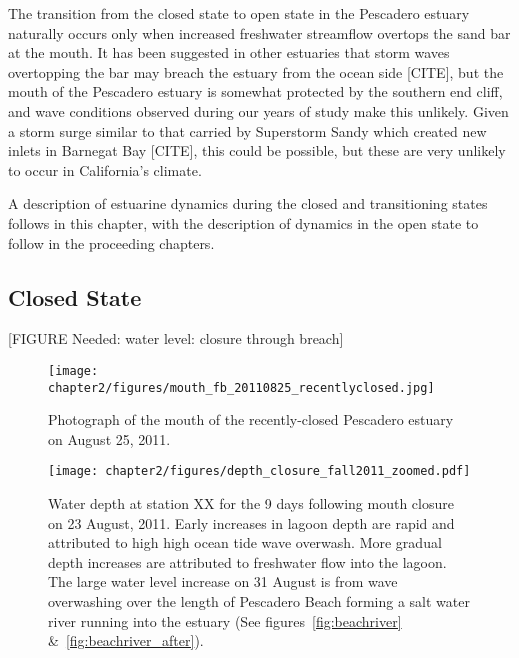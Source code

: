 The transition from the closed state to open state in the Pescadero estuary naturally occurs only when increased freshwater streamflow overtops the sand bar at the mouth. It has been suggested in other estuaries that storm waves overtopping the bar may breach the estuary from the ocean side [CITE], but the mouth of the Pescadero estuary is
somewhat protected by the southern end cliff, and wave conditions observed during our years of study make this unlikely. Given a storm surge similar to that carried by Superstorm Sandy which created new inlets in Barnegat Bay [CITE], this could be possible, but these are very unlikely to occur in California's climate.

A description of estuarine dynamics during the closed and transitioning states follows in this chapter, with the description of dynamics in the open state to follow in the proceeding chapters.


\subsection{Closed State} \label{ssec:ClosedDynamics}


[FIGURE Needed: water level: closure through breach]

\begin{figure}
	\begin{center}
		\texttt{[image: chapter2/figures/mouth\_fb\_20110825\_recentlyclosed.jpg]} \caption{Photograph of the mouth of the recently-closed Pescadero estuary on August 25, 2011.}
	\end{center}
\label{fig:mouth_fb_20110825} \end{figure}


\begin{figure}
	\begin{center}
		\texttt{[image: chapter2/figures/depth\_closure\_fall2011\_zoomed.pdf]} \caption{Water depth at station XX for the 9 days following mouth closure on 23 August, 2011. Early increases in lagoon depth are rapid and attributed to high high ocean tide wave overwash. More gradual depth increases are attributed to freshwater flow into the lagoon. The large water level increase on 31 August is from wave overwashing over the length of Pescadero Beach forming a salt water river running into the estuary (See figures~\ref{fig:beachriver} \&~\ref{fig:beachriver_after}).}
	\end{center}
\label{fig:depthclosuref11} \end{figure}



